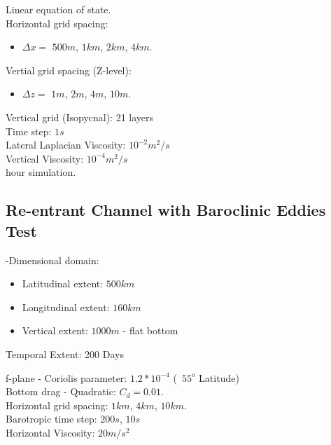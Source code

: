 \documentclass[11pt]{report}
\begin{document}
\noindent Linear equation of state.\\

\noindent Horizontal grid spacing: 
\begin{itemize}
	\item $\Delta x = $ $500m$, $1km$, $2km$, $4km$. 
\end{itemize}


\noindent Vertial grid spacing (Z-level): 
\begin{itemize}
	\item $\Delta z = $ $1m$, $2m$, $4m$, $10m$.
\end{itemize}

\noindent Vertical grid (Isopycnal): 21 layers \\

\noindent Time step: $1s$ \\

\noindent Lateral Laplacian Viscosity: $10^{-2} m^2/s$ \\
\noindent Vertical Viscosity: $10^{-4} m^2/s$ \\

 hour simulation.

\subsection{Re-entrant Channel with Baroclinic Eddies Test}

-Dimensional domain: 
\begin{itemize}
	\item Latitudinal extent: $500km$ 
	\item Longitudinal extent: $160km$ 
	\item Vertical extent: $1000m$ - flat bottom 
\end{itemize}

\noindent Temporal Extent: 200 Days

\noindent f-plane - Coriolis parameter: $1.2*10^{-4}$ (~$55^o$ Latitude)\\

\noindent Bottom drag - Quadratic: $C_d = 0.01$. \\

\noindent Horizontal grid spacing: $1km$, $4km$, $10km$. \\

\noindent Barotropic time step: $200s$, $10s$ \\

\noindent Horizontal Viscosity: $20 m/s^2$\\
\end{document}
